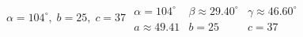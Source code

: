 { $\alpha = 104^{\circ}, \; b = 25, \; c  = 37$}
{ $\begin{array}{lll}\alpha = 104^{\circ} & \beta \approx 29.40^{\circ} & \gamma \approx 46.60^{\circ} \\a \approx 49.41 & b = 25 & c = 37 \end{array}$}
